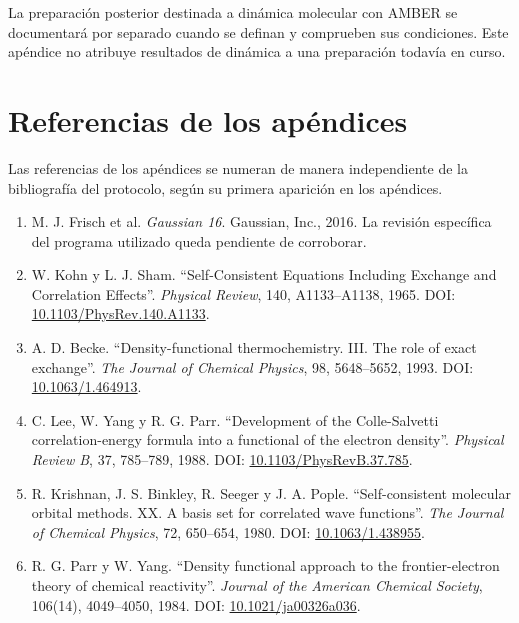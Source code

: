La preparación posterior destinada a dinámica molecular con AMBER se documentará por separado cuando se definan y comprueben sus condiciones. Este apéndice no atribuye resultados de dinámica a una preparación todavía en curso.


\clearpage
\chapter*{Referencias de los apéndices}
{}
Las referencias de los apéndices se numeran de manera independiente de la bibliografía del protocolo, según su primera aparición en los apéndices.
\begingroup
\renewcommand{\labelenumi}{[\arabic{enumi}]}
\begin{enumerate}
\setlength{\itemsep}{0.65\baselineskip}
\item\label{anexo-ref-1} M. J. Frisch et al. \textit{Gaussian 16}. Gaussian, Inc., 2016. La revisión específica del programa utilizado queda pendiente de corroborar.

\item\label{anexo-ref-2} W. Kohn y L. J. Sham. ``Self-Consistent Equations Including Exchange and Correlation Effects''. \textit{Physical Review}, 140, A1133--A1138, 1965. DOI: \href{https://doi.org/10.1103/PhysRev.140.A1133}{10.1103/PhysRev.140.A1133}.

\item\label{anexo-ref-3} A. D. Becke. ``Density-functional thermochemistry. III. The role of exact exchange''. \textit{The Journal of Chemical Physics}, 98, 5648--5652, 1993. DOI: \href{https://doi.org/10.1063/1.464913}{10.1063/1.464913}.

\item\label{anexo-ref-4} C. Lee, W. Yang y R. G. Parr. ``Development of the Colle-Salvetti correlation-energy formula into a functional of the electron density''. \textit{Physical Review B}, 37, 785--789, 1988. DOI: \href{https://doi.org/10.1103/PhysRevB.37.785}{10.1103/PhysRevB.37.785}.

\item\label{anexo-ref-5} R. Krishnan, J. S. Binkley, R. Seeger y J. A. Pople. ``Self-consistent molecular orbital methods. XX. A basis set for correlated wave functions''. \textit{The Journal of Chemical Physics}, 72, 650--654, 1980. DOI: \href{https://doi.org/10.1063/1.438955}{10.1063/1.438955}.

\item\label{anexo-ref-6} R. G. Parr y W. Yang. ``Density functional approach to the frontier-electron theory of chemical reactivity''. \textit{Journal of the American Chemical Society}, 106(14), 4049--4050, 1984. DOI: \href{https://doi.org/10.1021/ja00326a036}{10.1021/ja00326a036}.


\end{enumerate}
